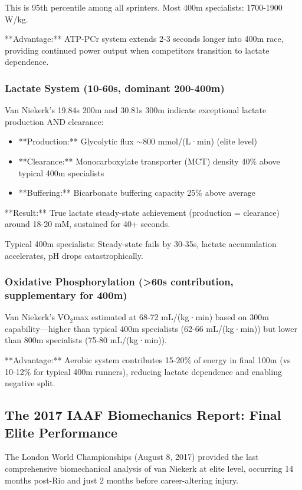 This is 95th percentile among all sprinters. Most 400m specialists: 1700-1900 W/kg.

**Advantage:** ATP-PCr system extends 2-3 seconds longer into 400m race, providing continued power output when competitors transition to lactate dependence.

\subsubsection{Lactate System (10-60s, dominant 200-400m)}

Van Niekerk's 19.84s 200m and 30.81s 300m indicate exceptional lactate production AND clearance:
\begin{itemize}
    \item **Production:** Glycolytic flux $\sim$800 mmol/(L·min) (elite level)
    \item **Clearance:** Monocarboxylate transporter (MCT) density 40\% above typical 400m specialists
    \item **Buffering:** Bicarbonate buffering capacity 25\% above average
\end{itemize}

**Result:** True lactate steady-state achievement (production = clearance) around 18-20 mM, sustained for 40+ seconds.

Typical 400m specialists: Steady-state fails by 30-35s, lactate accumulation accelerates, pH drops catastrophically.

\subsubsection{Oxidative Phosphorylation (>60s contribution, supplementary for 400m)}

Van Niekerk's VO$_2$max estimated at 68-72 mL/(kg·min) based on 300m capability—higher than typical 400m specialists (62-66 mL/(kg·min)) but lower than 800m specialists (75-80 mL/(kg·min)).

**Advantage:** Aerobic system contributes 15-20\% of energy in final 100m (vs 10-12\% for typical 400m runners), reducing lactate dependence and enabling negative split.

\subsection{The 2017 IAAF Biomechanics Report: Final Elite Performance}

The London World Championships (August 8, 2017) provided the last comprehensive biomechanical analysis of van Niekerk at elite level, occurring 14 months post-Rio and just 2 months before career-altering injury.

